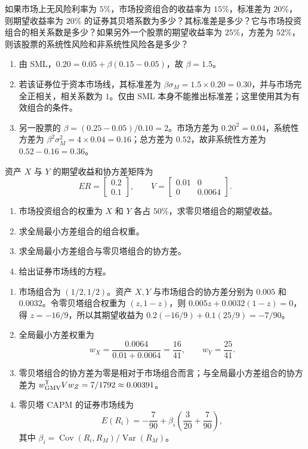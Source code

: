 \begin{problem}
 如果市场上无风险利率为 $5\%$，市场投资组合的收益率为 $15\%$，标准差为 $20\%$，则期望收益率为 $20\%$ 的证券其贝塔系数为多少？其标准差是多少？它与市场投资组合的相关系数是多少？如果另外一个股票的期望收益率为 $25\%$，方差为 $52\%$，则该股票的系统性风险和非系统性风险各是多少？
\end{problem}
\begin{solution}
\begin{enumerate}[label=(\alph*)]
\item 由 SML，$0.20=0.05+\beta(0.15-0.05)$，故 $\beta=1.5$。
\item 若该证券位于资本市场线，其标准差为 $\beta\sigma_M=1.5\times0.20=0.30$，并与市场完全正相关，相关系数为 $1$。仅由 SML 本身不能推出标准差；这里使用其为有效组合的条件。
\item 另一股票的 $\beta=(0.25-0.05)/0.10=2$。市场方差为 $0.20^2=0.04$，系统性方差为 $\beta^2\sigma_M^2=4\times0.04=0.16$；总方差为 $0.52$，故非系统性方差为 $0.52-0.16=0.36$。
\end{enumerate}
\end{solution}
\begin{problem}
 资产 $X$ 与 $Y$ 的期望收益和协方差矩阵为
\[
    ER=\begin{bmatrix}0.2\\0.1\end{bmatrix},\qquad
    V=\begin{bmatrix}0.01&0\\0&0.0064\end{bmatrix}.
\]
\begin{enumerate}[label=(\alph*)]
    \item 市场投资组合的权重为 $X$ 和 $Y$ 各占 $50\%$，求零贝塔组合的期望收益。
    \item 求全局最小方差组合的组合权重。
    \item 求全局最小方差组合与零贝塔组合的协方差。
    \item 给出证券市场线的方程。
\end{enumerate}
\end{problem}
\begin{solution}
\begin{enumerate}[label=(\alph*)]
\item 市场组合为 $(1/2,1/2)$。资产 $X,Y$ 与市场组合的协方差分别为 $0.005$ 和 $0.0032$。令零贝塔组合权重为 $(z,1-z)$，则 $0.005z+0.0032(1-z)=0$，得 $z=-16/9$，所以其期望收益为 $0.2(-16/9)+0.1(25/9)=-7/90$。
\item 全局最小方差权重为
\[
w_X=\frac{0.0064}{0.01+0.0064}=\frac{16}{41},\qquad w_Y=\frac{25}{41}.
\]
\item 零贝塔组合的协方差为零是相对于市场组合而言；与全局最小方差组合的协方差为 $w_{\rm GMV}^{\mathsf T}Vw_Z=7/1792\approx0.00391$。
\item 零贝塔 CAPM 的证券市场线为
\[
E(R_i)=-\frac7{90}+\beta_i\left(\frac{3}{20}+\frac7{90}\right),
\]
其中 $\beta_i=\operatorname{Cov}(R_i,R_M)/\operatorname{Var}(R_M)$。
\end{enumerate}
\end{solution}
